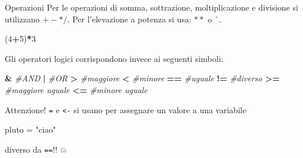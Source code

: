 \documentclass[
  ignorenonframetext,
]{beamer}
\newenvironment{Shaded}{\begin{snugshade}}{\end{snugshade}}
\newcommand{\CommentTok}[1]{\textcolor[rgb]{0.56,0.35,0.01}{\textit{#1}}}
\newcommand{\DecValTok}[1]{\textcolor[rgb]{0.00,0.00,0.81}{#1}}
\newcommand{\ErrorTok}[1]{\textcolor[rgb]{0.64,0.00,0.00}{\textbf{#1}}}
\newcommand{\NormalTok}[1]{#1}
\newcommand{\OperatorTok}[1]{\textcolor[rgb]{0.81,0.36,0.00}{\textbf{#1}}}
\newcommand{\StringTok}[1]{\textcolor[rgb]{0.31,0.60,0.02}{#1}}
\begin{document}
\begin{frame}[fragile]{Operazioni}
\protect\hypertarget{operazioni}{}
Per le operazioni di somma, sottrazione, moltiplicazione e divisione si
utilizzano \(+ - * /\). Per l'elevazione a potenza si usa: \(**\) o
\(ˆ\).

\begin{Shaded}
\begin{Highlighting}[]
\NormalTok{(}\DecValTok{4}\OperatorTok{+}\DecValTok{5}\NormalTok{)}\OperatorTok{*}\DecValTok{3}
\end{Highlighting}
\end{Shaded}

Gli operatori logici corrispondono invece ai seguenti simboli:

\begin{Shaded}
\begin{Highlighting}[]
\OperatorTok{\&}\StringTok{ }\CommentTok{\#AND}
\ErrorTok{|}\StringTok{ }\CommentTok{\#OR}
\ErrorTok{\textgreater{}}\StringTok{ }\CommentTok{\#maggiore}
\ErrorTok{\textless{}}\StringTok{ }\CommentTok{\#minore}
\ErrorTok{==}\StringTok{ }\CommentTok{\#uguale}
\ErrorTok{!=}\StringTok{ }\CommentTok{\#diverso}
\ErrorTok{\textgreater{}=}\StringTok{ }\CommentTok{\#maggiore uguale}
\ErrorTok{\textless{}=}\StringTok{ }\CommentTok{\#minore uguale}
\end{Highlighting}
\end{Shaded}

Attenzione! \texttt{=} e \texttt{\textless{}-} si usano per assegnare un
valore a una variabile

\begin{Shaded}
\begin{Highlighting}[]
\NormalTok{pluto =}\StringTok{ "ciao"}
\end{Highlighting}
\end{Shaded}

diverso da \texttt{==}!! 💥
\end{frame}
\end{document}
